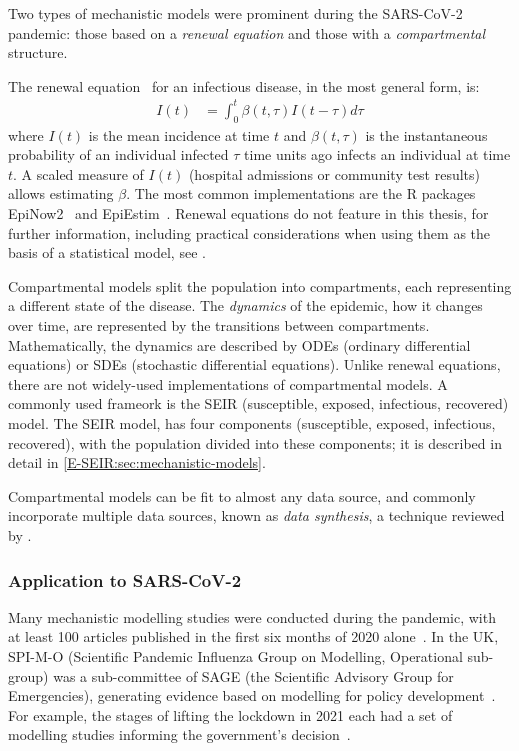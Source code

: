 \documentclass[thesis.tex]{subfiles}
\begin{document}
Two types of mechanistic models were prominent during the SARS-CoV-2 pandemic: those based on a \emph{renewal equation} and those with a \emph{compartmental} structure.

The renewal equation~\autocite{fraserRenewal} for an infectious disease, in the most general form, is:
\begin{align}
    I(t) &= \int_{0}^{t} \beta(t,\tau) I(t-\tau) d \tau
\end{align}
where $I(t)$ is the mean incidence at time $t$ and $\beta(t, \tau)$ is the instantaneous probability of an individual infected $\tau$ time units ago infects an individual at time $t$.
A scaled measure of $I(t)$ (\eg hospital admissions or community test results) allows estimating $\beta$.
The most common implementations are the R packages EpiNow2~\autocite{EpiNow2} and EpiEstim~\autocite{EpiEstim}.
Renewal equations do not feature in this thesis, for further information, including practical considerations when using them as the basis of a statistical model, see \textcite{nashEstimating,gosticPractical}.

Compartmental models split the population into compartments, each representing a different state of the disease.
The \emph{dynamics} of the epidemic, how it changes over time, are represented by the transitions between compartments.
Mathematically, the dynamics are described by ODEs (ordinary differential equations) or SDEs (stochastic differential equations).
Unlike renewal equations, there are not widely-used implementations of compartmental models.
A commonly used frameork is the SEIR (susceptible, exposed, infectious, recovered) model.
The SEIR model, has four components (susceptible, exposed, infectious, recovered), with the population divided into these components; it is described in detail in \cref{E-SEIR:sec:mechanistic-models}.

Compartmental models can be fit to almost any data source, and commonly incorporate multiple data sources, known as \emph{data synthesis}, a technique reviewed by \textcite{birrellEvidence}.


\subsubsection{Application to SARS-CoV-2}

Many mechanistic modelling studies were conducted during the pandemic, with at least 100 articles published in the first six months of 2020 alone~\autocite{shankarSystematic}.
In the UK, SPI-M-O (Scientific Pandemic Influenza Group on Modelling, Operational sub-group) was a sub-committee of SAGE (the Scientific Advisory Group for Emergencies), generating evidence based on modelling for policy development~\autocite{medleySPIM,govSPIMO}.
For example, the stages of lifting the lockdown in 2021 each had a set of modelling studies informing the government's decision~\autocite{sageEvidence}.
\end{document}
